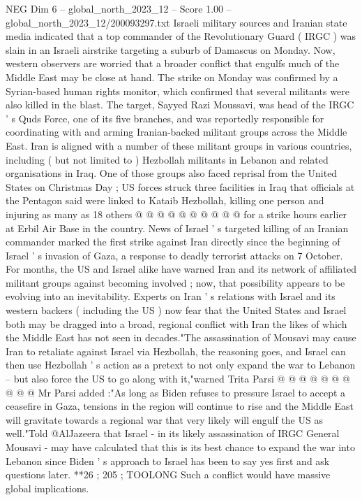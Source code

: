 \begin{textsample}{NEG Dim 6 – global\_north\_2023\_12 – Score 1.00 – global\_north\_2023\_12/200093297.txt}  \label{ex:f6_neg_260}
Israeli military sources and Iranian state media indicated that a top commander of the Revolutionary Guard ( IRGC ) was slain in an Israeli airstrike targeting a suburb of Damascus on Monday.
Now, western observers are worried that a broader conflict that engulfs much of the Middle East may be close at hand.
The strike on Monday was confirmed by a Syrian-based human rights monitor, which confirmed that several militants were also killed in the blast.
The target, Sayyed Razi Moussavi, was head of the IRGC ' s Quds Force, one of its five branches, and was reportedly responsible for coordinating with and arming Iranian-backed militant groups across the Middle East.
Iran is aligned with a number of these militant groups in various countries, including ( but not limited to ) Hezbollah militants in Lebanon and related organisations in Iraq.
One of those groups also faced reprisal from the United States on Christmas Day ; US forces struck three facilities in Iraq that officials at the Pentagon said were linked to Kataib Hezbollah, killing one person and injuring as many as 18 others @ @ @ @ @ @ @ @ @ @ for a strike hours earlier at Erbil Air Base in the country.
News of Israel ' s targeted killing of an Iranian commander marked the first strike against Iran directly since the beginning of Israel ' s invasion of Gaza, a response to deadly terrorist attacks on 7 October.
For months, the US and Israel alike have warned Iran and its network of affiliated militant groups against becoming involved ; now, that possibility appears to be evolving into an inevitability.
Experts on Iran ' s relations with Israel and its western backers ( including the US ) now fear that the United States and Israel both may be dragged into a broad, regional conflict with Iran the likes of which the Middle East has not seen in decades."The assassination of Mousavi may cause Iran to retaliate against Israel via Hezbollah, the reasoning goes, and Israel can then use Hezbollah ' s action as a pretext to not only expand the war to Lebanon -- but also force the US to go along with it,"warned Trita Parsi @ @ @ @ @ @ @ @ @ @ Mr Parsi added :"As long as Biden refuses to pressure Israel to accept a ceasefire in Gaza, tensions in the region will continue to rise and the Middle East will gravitate towards a regional war that very likely will engulf the US as well."Told @AlJazeera that Israel - in its likely assassination of IRGC General Mousavi - may have calculated that this is its best chance to expand the war into Lebanon since Biden ' s approach to Israel has been to say yes first and ask questions later. **26 ; 205 ; TOOLONG Such a conflict would have massive global implications.

\end{textsample}
